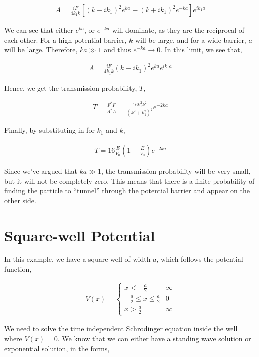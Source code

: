 \documentclass[11pt]{amsart}
\begin{document}
\begin{align*}
  A = \frac{iF}{4k_1 k} \left[{(k - ik_1)}^2 e^{ka} - {(k + ik_1)}^2 e^{-ka}\right] e^{ik_1a}
\end{align*}

We can see that either $e^{ka}$, or $e^{-ka}$ will dominate, as they are the reciprocal of each other. For a high potential barrier, $k$ will be large, and for a wide barrier, $a$ will be large. Therefore, $ka \gg 1$ and thus $e^{-ka} \to 0$. In this limit, we see that,

\begin{align*}
  A = \frac{iF}{4k_1 k} {(k - ik_1)}^2 e^{ka} e^{ik_1a}
\end{align*}

Hence, we get the transmission probability, $T$,

\begin{align*}
  T = \frac{F^* F}{A^* A} = \frac{16 k_1^2 k^2}{{(k^2 + k_1^2)}^2} e^{-2ka}
\end{align*}

Finally, by substituting in for $k_1$ and $k$,

\begin{align*}
  T = 16\frac{E}{V_0} \left(1 - \frac{E}{V_0}\right) e^{-2ka}
\end{align*}

Since we've argued that $ka \gg 1$, the transmission probability will be very small, but it will not be completely zero. This means that there is a finite probability of finding the particle to ``tunnel'' through the potential barrier and appear on the other side.

\section{Square-well Potential}

In this example, we have a square well of width $a$, which follows the potential function,

\begin{align*}
  V(x) =
  \begin{cases}
    x < -\frac{a}{2} & \infty \\
    -\frac{a}{2} \leq x \leq \frac{a}{2} & 0 \\
    x > \frac{a}{2} & \infty
  \end{cases}
\end{align*}

We need to solve the time independent Schrodinger equation inside the well where $V(x) = 0$. We know that we can either have a standing wave solution or exponential solution, in the forms,
\end{document}
